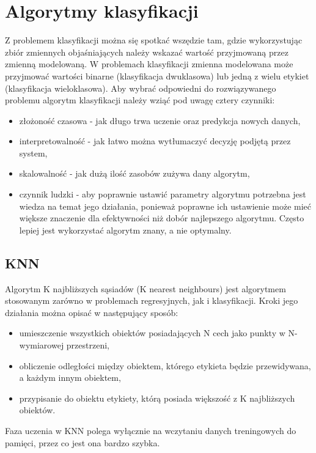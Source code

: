 \section{Algorytmy klasyfikacji}
Z problemem klasyfikacji można się spotkać wszędzie tam, gdzie wykorzystując
zbiór zmiennych objaśniających należy wskazać wartość przyjmowaną przez zmienną
modelowaną. W problemach klasyfikacji zmienna modelowana może przyjmować wartości
binarne (klasyfikacja dwuklasowa) lub jedną z wielu etykiet (klasyfikacja wieloklasowa).
Aby wybrać odpowiedni do rozwiązywanego problemu algorytm klasyfikacji należy wziąć 
pod uwagę cztery czynniki:
\begin{itemize}
    \item złożoność czasowa - jak długo trwa uczenie oraz predykcja nowych danych,
    \item interpretowalność - jak łatwo można wytłumaczyć decyzję podjętą przez 
    system,
    \item skalowalność - jak dużą ilość zasobów zużywa dany algorytm,
    \item czynnik ludzki - aby poprawnie ustawić parametry algorytmu potrzebna
    jest wiedza na temat jego działania, ponieważ poprawne ich ustawienie może 
    mieć większe znaczenie dla efektywności niż dobór najlepszego algorytmu. Często
    lepiej jest wykorzystać algorytm znany, a nie optymalny.
\end{itemize}

\subsection{KNN}

Algorytm K najbliższych sąsiadów (K nearest neighbours) jest algorytmem
stosowanym zarówno w problemach regresyjnych, jak i klasyfikacji. Kroki jego działania
można opisać w następujący sposób:
\begin{itemize}
    \item umieszczenie wszystkich obiektów posiadających N cech jako punkty w N-wymiarowej przestrzeni,
    \item obliczenie odległości między obiektem, którego etykieta będzie przewidywana, a każdym innym
    obiektem,
    \item przypisanie do obiektu etykiety, którą posiada większość z K najbliższych obiektów. 
\end{itemize}
Faza uczenia w KNN polega wyłącznie na wczytaniu danych treningowych do pamięci, przez co jest 
ona bardzo szybka.

